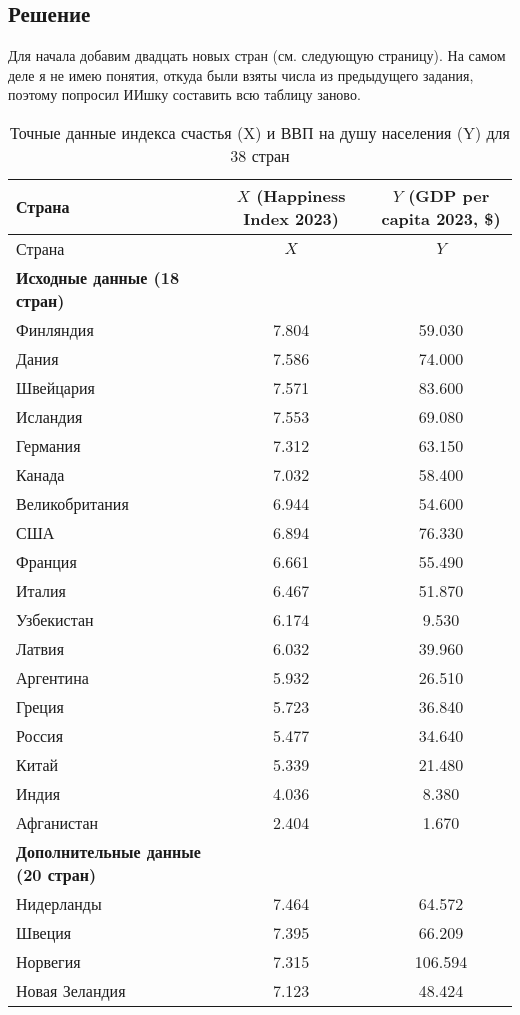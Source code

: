 \documentclass[12pt, a4paper]{article}
\begin{document}
\subsection*{Решение}
Для начала добавим двадцать новых стран (см. следующую страницу). На самом деле я не имею понятия, откуда были взяты числа из предыдущего задания, поэтому попросил ИИшку составить всю таблицу заново.\newpage
\begin{longtable}{|l|c|c|}
  \caption{Точные данные индекса счастья (X) и ВВП на душу населения (Y) для 38 стран}\\
  \hline
  Страна & $X$ (Happiness Index 2023) & $Y$ (GDP per capita 2023, \$) \\
  \hline
  \endfirsthead
  \hline
  Страна & $X$ & $Y$ \\
  \hline
  \endhead
  \hline
  \endfoot
  \hline
  \endlastfoot
  \textbf{Исходные данные (18 стран)} & & \\
  \hline
  Финляндия & 7.804 & 59.030 \\
  Дания & 7.586 & 74.000 \\
  Швейцария & 7.571 & 83.600 \\
  Исландия & 7.553 & 69.080 \\
  Германия & 7.312 & 63.150 \\
  Канада & 7.032 & 58.400 \\
  Великобритания & 6.944 & 54.600 \\
  США & 6.894 & 76.330 \\
  Франция & 6.661 & 55.490 \\
  Италия & 6.467 & 51.870 \\
  Узбекистан & 6.174 & 9.530 \\
  Латвия & 6.032 & 39.960 \\
  Аргентина & 5.932 & 26.510 \\
  Греция & 5.723 & 36.840 \\
  Россия & 5.477 & 34.640 \\
  Китай & 5.339 & 21.480 \\
  Индия & 4.036 & 8.380 \\
  Афганистан & 2.404 & 1.670 \\
  \hline
  \textbf{Дополнительные данные (20 стран)} & & \\
  \hline
  Нидерланды & 7.464 & 64.572 \\
  Швеция & 7.395 & 66.209 \\
  Норвегия & 7.315 & 106.594 \\
  Новая Зеландия & 7.123 & 48.424 \\

\end{longtable}
\end{document}
